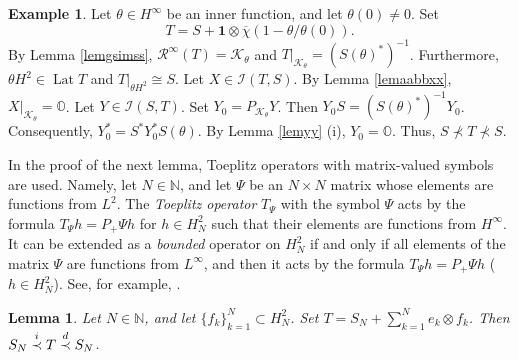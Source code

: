 \documentclass[a4paper,oneside,11pt]{amsart}
\numberwithin{equation}{section}
\theoremstyle{plain}
\newtheorem{lemma}[theorem]{Lemma}
\theoremstyle{definition}
\newtheorem{example}[theorem]{Example}
\begin{document}
\begin{example} Let $\theta\in H^\infty$ be an inner function, and let $\theta(0)\neq 0$. 
Set \begin{equation*} T=S+\mathbf{1}\otimes\overline\chi(1-\theta/\theta(0)). \end{equation*} 
By Lemma \ref{lemgsimss}, $\mathcal R^\infty(T)=\mathcal K_\theta$ and $T|_{\mathcal K_\theta}=(S(\theta)^*)^{-1}$. 
Furthermore,  $\theta H^2\in\operatorname{Lat}T$ and $T|_{\theta H^2}\cong S$. 
 Let $X\in\mathcal I(T,S)$. By Lemma \ref{lemaabbxx}, 
$X|_{\mathcal K_\theta}=\mathbb O$.  Let $Y\in\mathcal I(S,T)$. Set $Y_0=P_{\mathcal K_\theta}Y$. Then $Y_0S=(S(\theta)^*)^{-1}Y_0$. 
Consequently, $Y_0^*=S^*Y_0^*S(\theta)$. By Lemma \ref{lemyy} (i), $Y_0=\mathbb O$. Thus, 
$S\not\prec T\not\prec S$.
\end{example}

In the proof of the next lemma, 
Toeplitz operators with matrix-valued symbols 
 are used. Namely, let $N\in\mathbb N$, and let $\Psi$ be an $N\times N$ matrix whose elements are functions from $L^2$. 
The \emph{Toeplitz operator} $T_\Psi$ with the symbol $\Psi$ acts by the formula $T_\Psi h=P_+\Psi h$ for $h\in H^2_N$ 
such that their elements are  functions  from $H^\infty$. It can be extended as a \emph{bounded} operator on $H^2_N$ if and only if all elements of the matrix $\Psi$ are functions from $L^\infty$, and then it acts by the formula 
 $T_\Psi h=P_+\Psi h$  ($h\in H^2_N$).  See, for example, {\cite[Sec. 3.4]{peller}}. 


\begin{lemma}\label{lemma1} Let $N\in\mathbb N$, and let $\{f_k\}_{k=1}^{N}\subset H^2_N$. 
Set $T=S_N+\sum_{k=1}^{N}e_k\otimes f_k$. 
Then $S_N\buildrel i\over\prec T\buildrel d\over\prec S_N$.
\end{lemma} 
\end{document}
